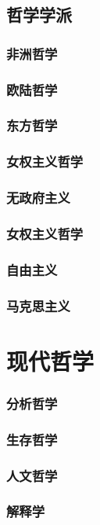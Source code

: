 \documentclass[UTF8]{../RepresentationUniverse}
\begin{document}
\section{哲学学派}
    \subsection{非洲哲学}
    \subsection{欧陆哲学}
    \subsection{东方哲学}
    \subsection{女权主义哲学}
    \subsection{无政府主义}
    \subsection{女权主义哲学}
    \subsection{自由主义}
    \subsection{马克思主义}




\chapter{现代哲学}
    \subsection{分析哲学}
    \subsection{生存哲学}
    \subsection{人文哲学}
    \subsection{解释学}
\end{document}
